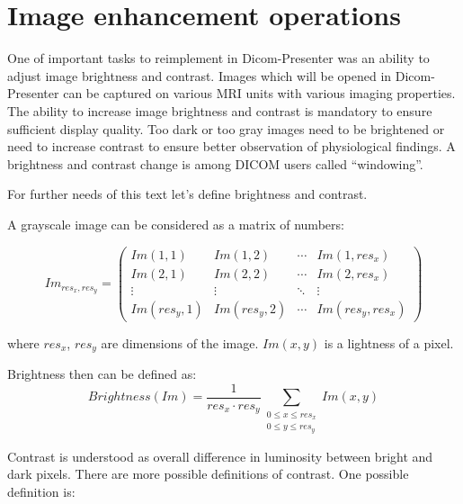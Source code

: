 

\section{Image enhancement operations}

One of important tasks to reimplement in Dicom-Presenter was an ability to adjust image brightness and contrast. Images which will be opened in Dicom-Presenter can be captured on various MRI units with various imaging properties. The ability to increase image brightness and contrast is mandatory to ensure sufficient display quality. Too dark or too gray images need to be brightened or need to increase contrast to ensure better observation of physiological findings. A brightness and contrast change is among DICOM users called ``windowing''.

For further needs of this text let's define brightness and contrast. 

A grayscale image can be considered as a matrix of numbers: 

\[
 Im_{res_{x},res_{y}} =
 \begin{pmatrix}
  Im(1,1) & Im(1,2) & \cdots & Im(1,res_{x}) \\
  Im(2,1) & Im(2,2) & \cdots & Im(2,res_{x}) \\
  \vdots  & \vdots  & \ddots & \vdots  \\
  Im(res_{y},1) & Im(res_{y},2) & \cdots & Im(res_{y},res_{x})
 \end{pmatrix}
\]

where $ res_{x} $, $res_{y}$ are dimensions of the image. $Im(x,y)$ is a lightness of a pixel.

Brightness then can be defined as:
\[
  Brightness(Im) = \frac{1}{res_{x}  \cdot res_{y}}\sum_{\substack{0 \leq x \leq res_{x} \\ 0 \leq y \leq res_{y}}} Im(x,y)
\]

Contrast is understood as overall difference in luminosity between bright and dark pixels. There are more possible definitions of contrast. One possible definition is:

